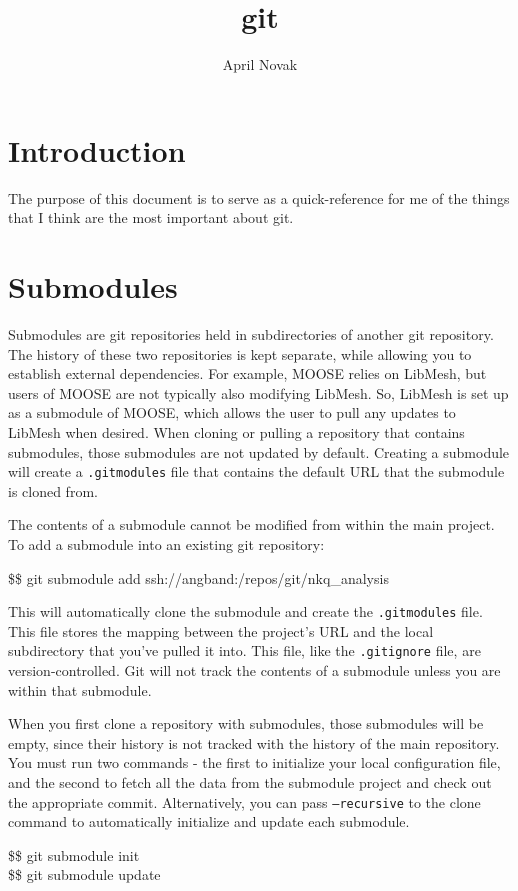 \documentclass[10pt]{article}
\title{git}
\author{April Novak}
\newenvironment{bash}
{\begin{tt}
\fontsize{8pt}{8pt}\selectfont}
{\end{tt}}
\begin{document}
\maketitle
\section{Introduction}

The purpose of this document is to serve as a quick-reference for me of the things that I think are the most important about git.

\section{Submodules}

Submodules are git repositories held in subdirectories of another git repository. The history of these two repositories is kept separate, while allowing you to establish external dependencies. For example, MOOSE relies on LibMesh, but users of MOOSE are not typically also modifying LibMesh. So, LibMesh is set up as a submodule of MOOSE, which allows the user to pull any updates to LibMesh when desired. When cloning or pulling a repository that contains submodules, those submodules are not updated by default. Creating a submodule will create a \texttt{.gitmodules} file that contains the default URL that the submodule is cloned from.

The contents of a submodule cannot be modified from within the main project. To add a submodule into an existing git repository:

\begin{bash}
\$\$ git submodule add ssh://angband:/repos/git/nkq\_analysis
\end{bash}

This will automatically clone the submodule and create the \texttt{.gitmodules} file. This file stores the mapping between the project's URL and the local subdirectory that you've pulled it into. This file, like the \texttt{.gitignore} file, are version-controlled. Git will not track the contents of a submodule unless you are within that submodule. 

When you first clone a repository with submodules, those submodules will be empty, since their history is not tracked with the history of the main repository. You must run two commands - the first to initialize your local configuration file, and the second to fetch all the data from the submodule project and check out the appropriate commit. Alternatively, you can pass \texttt{--recursive} to the clone command to automatically initialize and update each submodule.

\begin{bash}
\$\$ git submodule init\\
\$\$ git submodule update
\end{bash}
\end{document}
